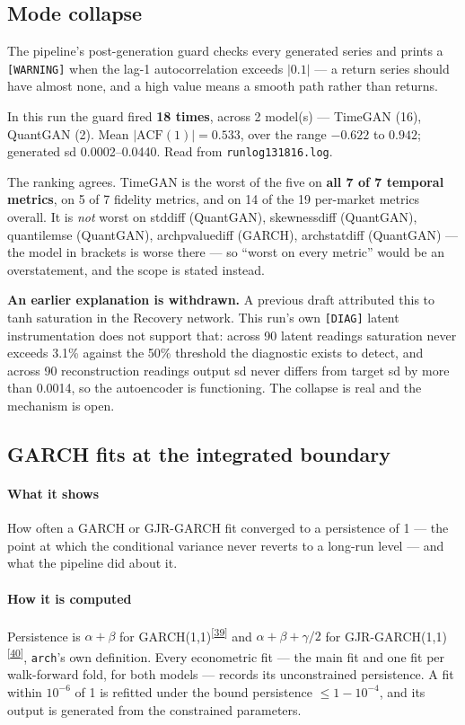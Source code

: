 \documentclass[11pt,a4paper]{article}
\makeatletter
\newcommand{\tcite}[1]{\textsuperscript{[\hyperlink{R:#1}{#1}]}}
\DeclareRobustCommand{\_}{\ifmmode\nfss@text{\textunderscore}\else\textunderscore\allowbreak\fi}
\makeatother
\begin{document}
\subsection{Mode collapse}
\label{sec:collapse}
The pipeline's post-generation guard checks every generated series and prints a \texttt{[WARNING]} when the lag-1 autocorrelation exceeds $|0.1|$ --- a return series should have almost none, and a high value means a smooth path rather than returns.

In this run the guard fired \textbf{18 times}, across 2 model(s) --- TimeGAN (16), QuantGAN (2). Mean \(|\text{ACF}(1)| = 0.533\), over the range \(-0.622\) to \(0.942\); generated sd 0.0002--0.0440. Read from \texttt{run\_log\_20260912\_131816.log}.

The ranking agrees. TimeGAN is the worst of the five on \textbf{all 7 of 7 temporal metrics}, on 5 of 7 fidelity metrics, and on 14 of the 19 per-market metrics overall. It is \emph{not} worst on std\_diff (QuantGAN), skewness\_diff (QuantGAN), quantile\_mse (QuantGAN), arch\_pvalue\_diff (GARCH), arch\_stat\_diff (QuantGAN) --- the model in brackets is worse there --- so ``worst on every metric'' would be an overstatement, and the scope is stated instead.

\textbf{An earlier explanation is withdrawn.} A previous draft attributed this to tanh saturation in the Recovery network. This run's own \texttt{[DIAG]} latent instrumentation does not support that: across 90 latent readings saturation never exceeds 3.1\% against the 50\% threshold the diagnostic exists to detect, and across 90 reconstruction readings output sd never differs from target sd by more than 0.0014, so the autoencoder is functioning. The collapse is real and the mechanism is open.

\subsection{GARCH fits at the integrated boundary}
\label{sec:boundary}

\paragraph{What it shows} How often a GARCH or GJR-GARCH fit converged to a persistence of 1 --- the point at which the conditional variance never reverts to a long-run level --- and what the pipeline did about it.

\paragraph{How it is computed} Persistence is $\alpha+\beta$ for GARCH(1,1)\tcite{39} and $\alpha+\beta+\gamma/2$ for GJR-GARCH(1,1)\tcite{40}, \texttt{arch}'s own definition. Every econometric fit --- the main fit and one fit per walk-forward fold, for both models --- records its unconstrained persistence. A fit within $10^{-6}$ of 1 is refitted under the bound persistence $\le 1-10^{-4}$, and its output is generated from the constrained parameters.
\end{document}
